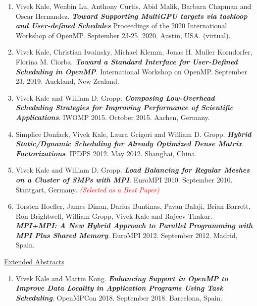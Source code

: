 \begin{enumerate}
\item Vivek Kale, Wenbin Lu, Anthony Curtis, Abid Malik, Barbara Chapman and Oscar Hernandez. \textbf{\textit{Toward Supporting MultiGPU targets via taskloop and User-defined Schedules}} Proceedings of the 2020 International Workshop of OpenMP. September 23-25, 2020. Austin, USA. (virtual). 
\item Vivek Kale, Christian Iwainsky, Michael Klemm, Jonas H. Muller Korndorfer, Florina M. Ciorba. \textbf{\textit{Toward a Standard Interface for User-Defined Scheduling in OpenMP}}. International Workshop on OpenMP. September 23, 2019. Auckland, New Zealand.

\item Vivek Kale and William D. Gropp. \textbf{\textit{Composing Low-Overhead Scheduling Strategies for Improving Performance of Scientific Applications}}. IWOMP 2015. October 2015. Aachen, Germany.
\item Simplice Donfack, Vivek Kale, Laura Grigori and William D. Gropp. \textbf{\textit{Hybrid Static/Dynamic Scheduling for Already Optimized Dense Matrix Factorizations}}. IPDPS 2012. May 2012. Shanghai, China.
\item Vivek Kale and William D. Gropp. \textbf{\textit{Load Balancing for Regular Meshes on a Cluster of SMPs with MPI}}. EuroMPI 2010. September 2010. Stuttgart, Germany. \textit{\textcolor{red}{(Selected as a Best Paper)}}
\item Torsten Hoefler, James Dinan, Darius Buntinas, Pavan Balaji, Brian Barrett, Ron Brightwell, William Gropp, Vivek Kale and Rajeev Thakur. \textbf{\textit{MPI+MPI: A New Hybrid Approach to Parallel Programming with MPI Plus Shared Memory}}. EuroMPI 2012. September 2012. Madrid, Spain.
\end{enumerate} 

\underline{Extended Abstracts}
\vspace*{-0.05in}
\begin{enumerate}
\item Vivek Kale and Martin Kong. \textbf{\textit{Enhancing Support in OpenMP to Improve Data Locality in Application Programs Using Task Scheduling}}. OpenMPCon 2018. September 2018. Barcelona, Spain.
\end{enumerate}

